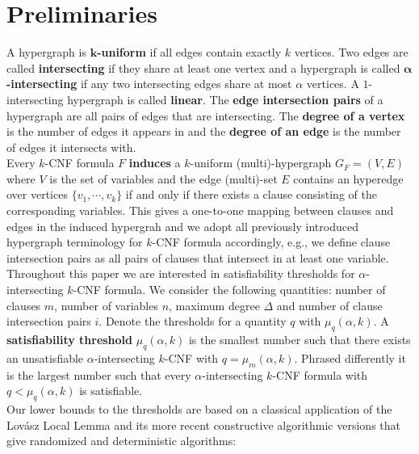 \documentclass[11pt,letterpaper]{article}
\begin{document}
\section{Preliminaries}

A hypergraph is $\mathbf k${\bfseries-uniform} if all edges contain exactly $k$ vertices. Two edges are called {\bfseries intersecting} if they share at least one vertex and a hypergraph is called $\mathbf \alpha${\bfseries-intersecting} if any two intersecting edges share at most $\alpha$ vertices. A $1$-intersecting hypergraph is called {\bfseries linear}. The {\bfseries edge intersection pairs} of a hypergraph are all pairs of edges that are intersecting. The {\bfseries degree of a vertex} is the number of edges it appears in and the {\bfseries degree of an edge} is the number of edges it intersects with.\\

Every $k$-CNF formula $F$ {\bf induces} a $k$-uniform (multi)-hypergraph $G_F=(V,E)$ where $V$ is the set of variables and the edge (multi)-set $E$ contains an hyperedge over vertices $\{v_1,\cdots,v_k\}$ if and only if there exists a clause consisting of the corresponding variables. This gives a one-to-one mapping between clauses and edges in the induced hypergrah and we adopt all previously introduced hypergraph terminology for $k$-CNF formula accordingly, e.g., we define clause intersection pairs as all pairs of clauses that intersect in at least one variable.\\

Throughout this paper we are interested in satisfiability thresholds for $\alpha$-intersecting $k$-CNF formula. We consider the following quantities: number of clauses $m$, number of variables $n$, maximum degree $\Delta$ and number of clause intersection pairs $i$. Denote the thresholds for a quantity $q$ with $\mu_q(\alpha,k)$. A {\bfseries satisfiability threshold} $\mu_q(\alpha,k)$ is the smallest number such that there exists an unsatisfiable $\alpha$-intersecting $k$-CNF with $q=\mu_m(\alpha, k)$. Phrased differently it is the largest number such that every $\alpha$-intersecting $k$-CNF formula with $q < \mu_q(\alpha, k)$ is satisfiable.\\

Our lower bounds to the thresholds are based on a classical application of the Lov\'asz Local Lemma \cite{ErdoesLovasz} and its more recent constructive algorithmic versions that give randomized \cite{moser08} and deterministic \cite{MT-JACM,llldeterministic} algorithms:
\end{document}
